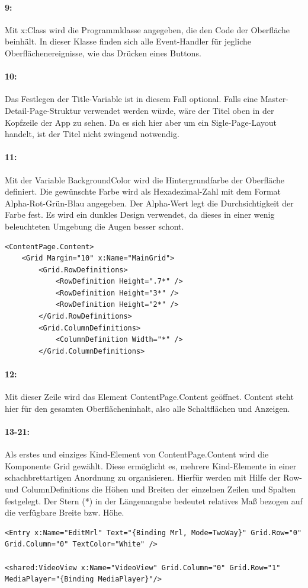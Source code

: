 \paragraph{9:} Mit x:Class wird die Programmklasse angegeben, die den Code der Oberfläche beinhält. In dieser Klasse finden sich alle Event-Handler für jegliche Oberflächenereignisse, wie das Drücken eines Buttons.
\paragraph{10:} Das Festlegen der Title-Variable ist in diesem Fall optional. Falls eine Master-Detail-Page-Struktur verwendet werden würde, wäre der Titel oben in der Kopfzeile der App zu sehen. Da es sich hier aber um ein Sigle-Page-Layout handelt, ist der Titel nicht zwingend notwendig.
\paragraph{11:} Mit der Variable BackgroundColor wird die Hintergrundfarbe der Oberfläche definiert. Die gewünschte Farbe wird als Hexadezimal-Zahl mit dem Format Alpha-Rot-Grün-Blau angegeben. Der Alpha-Wert legt die Durchsichtigkeit der Farbe fest. Es wird ein dunkles Design verwendet, da dieses in einer wenig beleuchteten Umgebung die Augen besser schont.

\begin{verbatim}
<ContentPage.Content>
    <Grid Margin="10" x:Name="MainGrid">
        <Grid.RowDefinitions>
            <RowDefinition Height=".7*" />
            <RowDefinition Height="3*" />
            <RowDefinition Height="2*" />
        </Grid.RowDefinitions>
        <Grid.ColumnDefinitions>
            <ColumnDefinition Width="*" />
        </Grid.ColumnDefinitions>
\end{verbatim}
\paragraph{12:} Mit dieser Zeile wird das Element ContentPage.Content geöffnet. Content steht hier für den gesamten Oberflächeninhalt, also alle Schaltflächen und Anzeigen.
\paragraph{13-21:} Als erstes und einziges Kind-Element von ContentPage.Content wird die Komponente Grid gewählt. Diese ermöglicht es, mehrere Kind-Elemente in einer schachbrettartigen Anordnung zu organisieren. Hierfür werden mit Hilfe der Row- und ColumnDefinitions die Höhen und Breiten der einzelnen Zeilen und Spalten festgelegt. Der Stern (*) in der Längenangabe bedeutet relatives Maß bezogen auf die verfügbare Breite bzw. Höhe.
\begin{verbatim}
<Entry x:Name="EditMrl" Text="{Binding Mrl, Mode=TwoWay}" Grid.Row="0" Grid.Column="0" TextColor="White" />

<shared:VideoView x:Name="VideoView" Grid.Column="0" Grid.Row="1" MediaPlayer="{Binding MediaPlayer}"/>
\end{verbatim}
